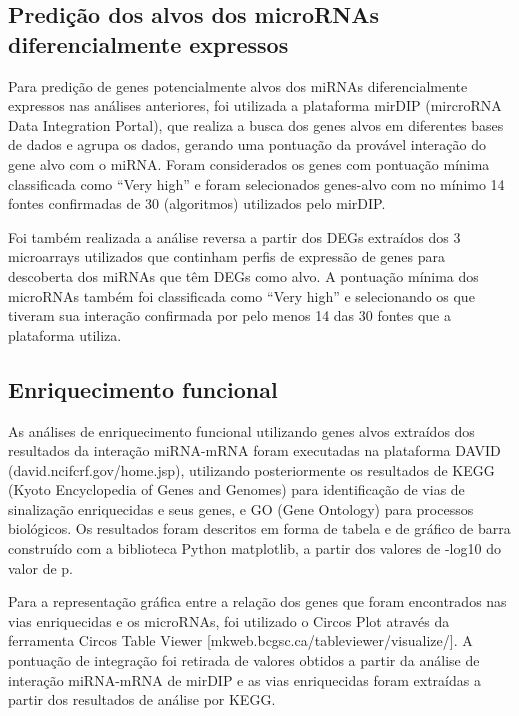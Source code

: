 \documentclass[12pt, a4paper]{article}
\begin{document}
    \subsection{Predição dos alvos dos microRNAs diferencialmente expressos}
    \par Para predição de genes potencialmente alvos dos miRNAs diferencialmente expressos nas análises anteriores, foi utilizada a plataforma mirDIP (mircroRNA Data Integration Portal), que realiza a busca dos genes alvos em diferentes bases de dados e agrupa os dados, gerando uma pontuação da provável interação do gene alvo com o miRNA. Foram considerados os genes com pontuação mínima classificada como “Very high” e foram selecionados genes-alvo com no mínimo 14 fontes confirmadas de 30 (algoritmos) utilizados pelo mirDIP.
    \par Foi também realizada a análise reversa a partir dos DEGs extraídos dos 3 microarrays utilizados que continham perfis de expressão de genes para descoberta dos miRNAs que têm DEGs como alvo. A pontuação mínima dos microRNAs também foi classificada como “Very high” e selecionando os que tiveram sua interação confirmada por pelo menos 14 das 30 fontes que a plataforma utiliza.

    \subsection{Enriquecimento funcional}
    \par As análises de enriquecimento funcional utilizando genes alvos extraídos dos resultados da interação miRNA-mRNA foram executadas na plataforma DAVID (david.ncifcrf.gov/home.jsp), utilizando posteriormente os resultados de KEGG (Kyoto Encyclopedia of Genes and Genomes) para identificação de vias de sinalização enriquecidas e seus genes, e GO (Gene Ontology) para processos biológicos. Os resultados foram descritos em forma de tabela e de gráfico de barra construído com a biblioteca Python matplotlib, a partir dos valores de -log10 do valor de p.
    \par Para a representação gráfica entre a relação dos genes que foram encontrados nas vias enriquecidas e os microRNAs, foi utilizado o Circos Plot através da ferramenta Circos Table Viewer [mkweb.bcgsc.ca/tableviewer/visualize/]. A pontuação de integração foi retirada de valores obtidos a partir da análise de interação miRNA-mRNA de mirDIP e as vias enriquecidas foram extraídas a partir dos resultados de análise por KEGG.
\end{document}
